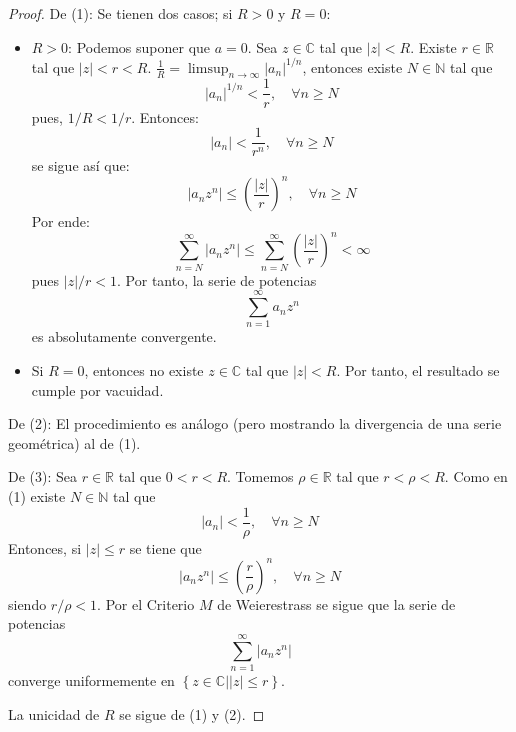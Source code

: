 \documentclass[12pt]{report}
\theoremstyle{largebreak}
\newcommand\abs[1]{\ensuremath{\left|#1\right|}}
\begin{document}
    \begin{proof}
        De (1): Se tienen dos casos; si $R>0$ y $R=0$:
        \begin{itemize}
            \item \textbf{$R>0$}: Podemos suponer que $a=0$. Sea $z\in\mathbb{C}$ tal que $\abs{z}<R$. Existe $r\in\mathbb{R}$ tal que $\abs{z}<r<R$. $\frac{1}{R}=\limsup_{ n\rightarrow\infty}\abs{a_n}^{ 1/n}$, entonces existe $N\in\mathbb{N}$ tal que
            \begin{equation*}
                \abs{a_n}^{ 1/n}<\frac{1}{r},\quad\forall n\geq N
            \end{equation*}
            pues, $1/R<1/r$. Entonces:
            \begin{equation*}
                \abs{a_n}<\frac{1}{r^n},\quad\forall n\geq N
            \end{equation*}
            se sigue así que:
            \begin{equation*}
                \abs{a_nz^n}\leq\left(\frac{\abs{z}}{r}\right)^n,\quad\forall n\geq N
            \end{equation*}
            Por ende:
            \begin{equation*}
                \sum_{ n=N}^\infty\abs{a_nz^n}\leq\sum_{ n=N}^\infty\left(\frac{\abs{z}}{r}\right)^n<\infty
            \end{equation*}
            pues $\abs{z}/r<1$. Por tanto, la serie de potencias
            \begin{equation*}
                \sum_{ n=1}^\infty a_nz^n
            \end{equation*}
            es absolutamente convergente.
            \item Si $R=0$, entonces no existe $z\in\mathbb{C}$ tal que $\abs{z}<R$. Por tanto, el resultado se cumple por vacuidad.
        \end{itemize}

        De (2): El procedimiento es análogo (pero mostrando la divergencia de una serie geométrica) al de (1).

        De (3): Sea $r\in\mathbb{R}$ tal que $0<r<R$. Tomemos $\rho\in\mathbb{R}$ tal que $r<\rho<R$. Como en (1) existe $N\in\mathbb{N}$ tal que
        \begin{equation*}
            \abs{a_n}<\frac{1}{\rho},\quad\forall n\geq N
        \end{equation*}
        Entonces, si $\abs{z}\leq r$ se tiene que
        \begin{equation*}
            \abs{a_nz^n}\leq\left(\frac{r}{\rho}\right)^n,\quad\forall n\geq N
        \end{equation*}
        siendo $r/\rho<1$. Por el Criterio $M$ de Weierestrass se sigue que la serie de potencias
        \begin{equation*}
            \sum_{ n=1}^\infty \abs{a_nz^n}
        \end{equation*}
        converge uniformemente en $\left\{ z\in\mathbb{C}\Big|\abs{z}\leq r \right\}$.

        La unicidad de $R$ se sigue de (1) y (2).
    \end{proof}
\end{document}

